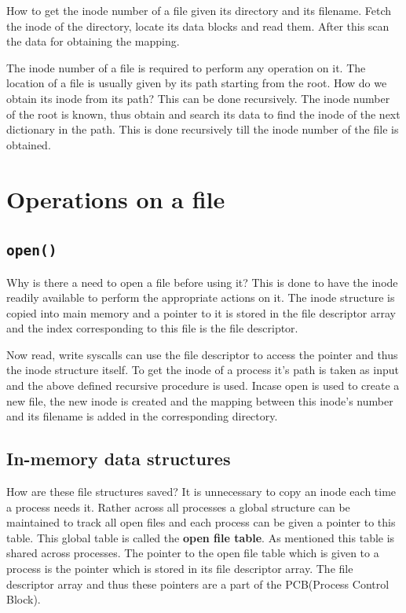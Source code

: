 \documentclass[12pt]{article}
\begin{document}
How to get the inode number of a file given its directory and its filename. Fetch the inode of the directory, locate its data blocks and read them. After this scan the data for obtaining the mapping. 

The inode number of a file is required to perform any operation on it. The location of a file is usually given by its path starting from the root. How do we obtain its inode from its path?
This can be done recursively. The inode number of the root is known, thus obtain and search its data to find the inode of the next dictionary in the path. This is done recursively till the inode number of the file is obtained. 

\section{Operations on a file}
\subsection{\texttt{open()}}
Why is there a need to open a file before using it? This is done to have the inode readily available to perform the appropriate actions on it. 
The inode structure is copied into main memory and a pointer to it is stored in the file descriptor array and the index corresponding to this file is the file descriptor. 

Now read, write syscalls can use the file descriptor to access the pointer and thus the inode structure itself. To get the inode of a process it's path is taken as input and the above defined recursive procedure is used. 
Incase open is used to create a new file, the new inode is created and the mapping between this inode's number and its filename is added in the corresponding directory. 



\subsection{In-memory data structures}
How are these file structures saved? It is unnecessary to copy an inode each time a process needs it. Rather across all processes a global structure can be maintained to track all open files and each process can be given a pointer to this table. 
This global table is called the \textbf{open file table}. As mentioned this table is shared across processes. The pointer to the open file table which is given to a process is the pointer which is stored in its file descriptor array. The file descriptor array and thus these pointers are a part of the PCB(Process Control Block).  
\end{document}

